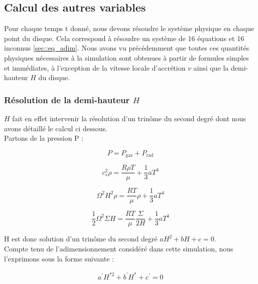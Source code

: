\subsection{Calcul des autres variables}

Pour chaque temps t donné, nous devons résoudre le système physique en chaque
point du disque. Cela correspond à résoudre un système de 16 équations et 16
inconnus \ref{sec::eq_adim}. Nous avons vu précédemment que toutes ces
quantités physiques nécessaires à  la simulation sont obtenues à  partir de
formules simples et immédiates, à  l'exception de la vitesse locale d'accrétion
$v$ ainsi que la demi-hauteur $H$ du disque.

\subsubsection{Résolution de la demi-hauteur $H$}
\label{ssec::resolution_H}

  $H$ fait en effet intervenir la résolution d'un trinôme du second degré dont nous avons détaillé le calcul ci dessous. \\

Partons de la pression P : 

\begin{equation}
	P = P_\textrm{gaz} + P_\textrm{rad}
\end{equation}


\begin{equation}
	c_{s}^{2} \rho = \frac{R \rho T}{\mu} + \frac{1}{3} a T^{4}
\end{equation}


\begin{equation}
	\Omega^{2} H^{2} \rho = \frac{R T}{\mu} \rho + \frac{1}{3} a T^{4}
\end{equation}


\begin{equation}
	\frac{1}{2} \Omega^{2} \Sigma H = \frac{R T}{\mu} \frac{\Sigma}{2 H} + \frac{1}{3} a T^{4}
\end{equation}

H est donc solution d'un trinôme du second degré $ a H^{2} + b H + c = 0$. \\
Compte tenu de l'adimensionnement considéré dans cette simulation, nous l'exprimons sous la forme suivante :  

\begin{eqnarray}
  a^{\prime} H^{* 2}+b^{\prime}H^{*}+c^{\prime}=0
  \end{eqnarray}

